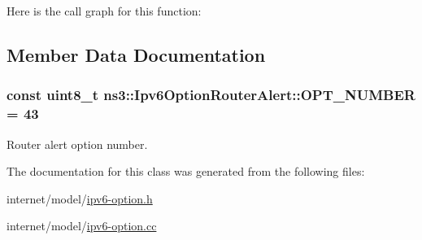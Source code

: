 Here is the call graph for this function\+:




\subsection{Member Data Documentation}
\subsubsection[{\texorpdfstring{O\+P\+T\+\_\+\+N\+U\+M\+B\+ER}{OPT_NUMBER}}]{\setlength{\rightskip}{0pt plus 5cm}const uint8\+\_\+t ns3\+::\+Ipv6\+Option\+Router\+Alert\+::\+O\+P\+T\+\_\+\+N\+U\+M\+B\+ER = 43\hspace{0.3cm}{\ttfamily [static]}}\hypertarget{classns3_1_1Ipv6OptionRouterAlert_a113d88d1083a09aacae209ad442439f6}{}\label{classns3_1_1Ipv6OptionRouterAlert_a113d88d1083a09aacae209ad442439f6}


Router alert option number. 



The documentation for this class was generated from the following files\+:\begin{DoxyCompactItemize}
\item 
internet/model/\hyperlink{ipv6-option_8h}{ipv6-\/option.\+h}\item 
internet/model/\hyperlink{ipv6-option_8cc}{ipv6-\/option.\+cc}\end{DoxyCompactItemize}
